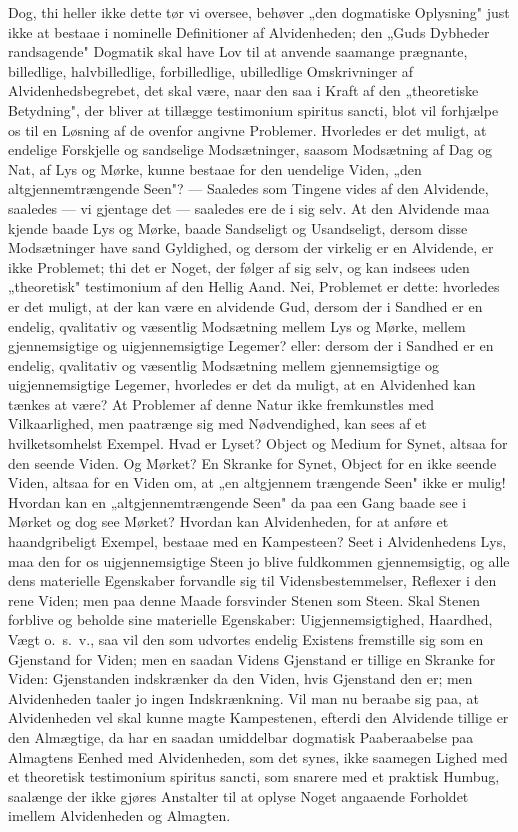 \documentclass[12pt]{book}
\newcommand{\opage}[1]{\marginnote{\footnotesize\textit{[#1]}}}
\begin{document}
Dog, thi heller ikke dette tør vi oversee, behøver „den dogmatiske Oplysning" just
ikke at bestaae i nominelle Definitioner af Alvidenheden; den „Guds Dybheder
randsagende" Dogmatik skal have Lov til at anvende saamange prægnante, billedlige,
halvbilledlige, forbilledlige, ubilledlige Omskrivninger af Alvidenhedsbegrebet,
det skal være, naar den saa i Kraft af den „theoretiske Betydning", der bliver at
tillægge testimonium spiritus sancti, blot vil forhjælpe os til en Løsning af de
ovenfor angivne Problemer. Hvorledes er det muligt, at endelige Forskjelle og
sandselige Modsætninger, saasom Modsætning af Dag og Nat, af Lys og Mørke, kunne
bestaae for den uendelige Viden, „den altgjennemtrængende Seen"? --- Saaledes som
Tingene vides af den Alvidende, saaledes --- vi gjentage det --- saaledes ere de i
sig selv. At den Alvidende maa kjende baade Lys og Mørke, baade Sandseligt og
Usandseligt, dersom disse Modsætninger have sand Gyldighed, og dersom der virkelig
er en Alvidende, er ikke Problemet; thi det er Noget, der følger af sig selv, og
kan indsees uden „theoretisk" testimonium af den Hellig Aand. Nei, Problemet er
dette: hvorledes er det muligt, at der kan være en alvidende Gud, dersom der i
Sandhed er en endelig, qvalitativ og væsentlig Modsætning mellem Lys og Mørke,
mellem gjennemsigtige og uigjennemsigtige Legemer? eller: dersom der i Sandhed er
en endelig, qvalitativ og væsentlig Modsætning mellem gjennemsigtige og
uigjennemsigtige Legemer, hvorledes er det da muligt, at en Alvidenhed kan tænkes
at være? At Problemer af denne Natur ikke fremkunstles med Vilkaarlighed, men
paatrænge sig med Nødvendighed, kan sees af et hvilketsomhelst Exempel. Hvad er
Lyset? Object og Medium for Synet, altsaa for den seende Viden. Og Mørket? En
Skranke for Synet, Object for en ikke seende Viden, altsaa for en Viden om, at „en
altgjennem%
\opage{52} trængende Seen" ikke er mulig! Hvordan kan en „altgjennemtrængende Seen" da paa
een Gang baade see i Mørket og dog see Mørket? Hvordan kan Alvidenheden, for at
anføre et haandgribeligt Exempel, bestaae med en Kampesteen? Seet i Alvidenhedens
Lys, maa den for os uigjennemsigtige Steen jo blive fuldkommen gjennemsigtig, og
alle dens materielle Egenskaber forvandle sig til Vidensbestemmelser, Reflexer i
den rene Viden; men paa denne Maade forsvinder Stenen som Steen. Skal Stenen
forblive og beholde sine materielle Egenskaber: Uigjennemsigtighed, Haardhed, Vægt
o.~s.~v., saa vil den som udvortes endelig Existens fremstille sig som en Gjenstand
for Viden; men en saadan Videns Gjenstand er tillige en Skranke for Viden:
Gjenstanden indskrænker da den Viden, hvis Gjenstand den er; men Alvidenheden
taaler jo ingen Indskrænkning. Vil man nu beraabe sig paa, at Alvidenheden vel
skal kunne magte Kampestenen, efterdi den Alvidende tillige er den Almægtige, da
har en saadan umiddelbar dogmatisk Paaberaabelse paa Almagtens Eenhed med
Alvidenheden, som det synes, ikke saamegen Lighed med et theoretisk testimonium
spiritus sancti, som snarere med et praktisk Humbug, saalænge der ikke gjøres
Anstalter til at oplyse Noget angaaende Forholdet imellem Alvidenheden og Almagten.
\end{document}
